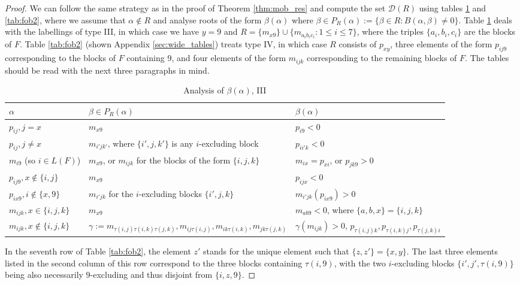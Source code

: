 \documentclass[11pt]{amsart}
\theoremstyle{plain}
\theoremstyle{definition}
\theoremstyle{remark}
\numberwithin{equation}{section}
\newcommand{\al}{\alpha}
\newcommand{\be}{\beta}
\newcommand{\res}{\mathscr{D}}
\newcommand{\pra}{P_R(\al)}
\begin{document}
\begin{proof}
We can follow the same strategy as in the proof of Theorem \ref{thm:mob_res} and
compute the set $\res(R)$ using tables  \ref{tab:fob1} and \ref{tab:fob2}, where
we assume that $\al\notin R$ and analyse roots of the form $\be(\al)$ where
$\be\in \pra:=\{\be\in R: B(\al,\be)\neq 0\}$. Table \ref{tab:fob1} deals with
the labellings of type III, in which case we have $y=9$ and $R=\{m_{x9}\}\cup
\{m_{a_ib_ic_i}:1\le i\le 7\}$, where the triples $\{a_i,b_i,c_i\}$ are the
blocks of $F$. Table \ref{tab:fob2} (shown Appendix \ref{sec:wide_tables})
treats type IV, in which case $R$ consists of $p_{xy}$, three elements of the
form $p_{ij9}$ corresponding to the blocks of $F$ containing 9, and four
elements of the form $m_{ijk}$ corresponding to the remaining blocks of $F$. 
The tables should be read with the next three paragraphs in mind.

\begin{table}[h!]
  \centering
\begin{tabular}{@{}lll@{}}
\toprule
  $\al$ & $\be\in \pra$ & $\be(\al)$ \\
  \midrule
  $p_{ij}, j=x$ & $m_{x9}$  & $p_{i9}<0$ \\
  $p_{ij}, j\neq x$ & $m_{i'jk'}$, where $\{i',j,k'\}$ is any
  $i$-excluding block & $p_{ii'k}<0$ \\
  \midrule
  $m_{i9}$ (so $i\in L(F)$) & $m_{x9}$, or $m_{ijk}$ for the blocks of the form
  $\{i,j,k\}$  & $m_{ix}=p_{xi}$, or $p_{jk9}>0$ \\
  \midrule
  $p_{ij9}, x\notin \{i,j\}$ & $m_{x9}$ & $p_{ijx}<0$\\
  $p_{ix9}, i\notin \{x,9\}$ & $m_{i'jk}$ for the $i$-excluding blocks
  $\{i',j,k\}$ & $m_{i'jk}(p_{ix9})>0$\\
  \midrule
  $m_{ijk}, x\in \{i,j,k\}$ & $m_{x9}$ & $m_{ab9}<0$, where
  $\{a,b,x\}=\{i,j,k\}$\\
  $m_{ijk}, x\notin \{i,j,k\}$ & $\gamma:=m_{\tau(i,j)\tau(i,k)\tau(j,k)}, m_{ij\tau(i,j)},m_{ik\tau(i,k)}, m_{jk\tau(j,k)}
  $ &
  $\gamma(m_{ijk})>0$, $p_{\tau(i,j)k},p_{\tau(i,k)j}, p_{\tau(j,k)i}$\\
  \bottomrule
\end{tabular}
\caption{Analysis of $\be(\al)$, III}
\label{tab:fob1}
\end{table}


In the seventh row of Table \ref{tab:fob2}, the element $z'$ stands for the
unique element such that $\{z,z'\}=\{x,y\}$. The last three elements listed in
the second column of this row correspond to the three blocks containing
$\tau(i,9)$, with the two $i$-excluding blocks $\{i',j',\tau(i,9)\}$ being also
necessarily $9$-excluding and thus disjoint from $\{i,z,9\}$. 


\end{proof}
\end{document}

